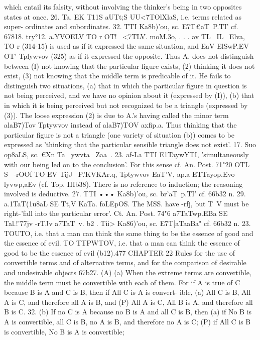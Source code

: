 {{{{{{which entail its falsity, without involving the thinker's being
in two opposites states at once.
26. Ta. EK T11S aUTt;S UU<7TOlXlaS, i.e. terms related as super-
ordinates and subordinates.
32. TTI Ka8b)'ou, sc. E7T£aT~P.TI' cf. 67818.
try°12. a.YVOELV TO r OT! ~<7TLV. {moM.{3o, . . . av TL~ IL~ Elva,
TO r (314-15) is used as if it expressed the same situation, and EaV
ElSwP.EV OT' Tplywvov (325) as if it expressed the opposite. Thus A.
does not distinguish between (I) not knowing that the particular
figure exists, (2) thinking it does not exist, (3) not knowing that
the middle term is predicable of it. He fails to distinguish two
situations, (a) that in which the particular figure in question is
not being perceived, and we have no opinion about it (expressed
by (I)), (b) that in which it is being perceived but not recognized
to be a triangle (expressed by (3)). The loose expression (2) is
due to A.'s having called the minor term alaB7)Tov Tptywvov
instead of alaB7)TOV axfip.a. Thus thinking that the particular
figure is not a triangle (one variety of situation (b)) comes to be
expressed as 'thinking that the particular sensible triangle does
not exist'.
17. Suo op8aLS, sc. €Xn Ta~ ywvta~ Zaa~.
23. af-La TTI E1TaywYTI, 'simultaneously with our being led on
to the conclusion'. For this sense cf. An. Post. 71"20 OTL S~ -rOOf
TO EV TijJ ~P.'KVKAr.q, Tptywvov EaT'V, ap.a ETTayop.Evo~ lyvwp,aEv (cf.
Top. IIIb38). There is no reference to induction; the reasoning
involved is deductive.
27. TTI ••• Ka8b)'ou, sc. br'aT~p.TI' cf. 66b32 n.
29. a.1TaT(1u8aL SE Tt,V KaTa. foLEpOS. The MSS. have -rfj, but
T~V must be right-'fall into the particular error'. Ct. An. Post.
74"6 a7TaTwp.EBa SE Tal.!'77jv -rTJv a7TaT~v.
b2 . Tii> Ka86)'ou, sc. E7T[aTaaBa" cf. 66b32 n.
23. TOUTO, i.e. that a man can think the same thing to be the
essence of good and the essence of evil. TO TTPWTOV, i.e. that a man
can think the essence of good to be the essence of evil (b12).477
CHAPTER 22
Rules for the use of convertible terms and of alternative terms, and for
the comparison of desirable and undesirable objects
67b27. (A) (a) When the extreme terms are convertible, the
middle term must be convertible with each of them. For if A is
true of C because B is A and C is B, then if All C is A is convert-
ible, (a) All C is B, All A is C, and therefore all A is B, and (P)
All A is C, All B is A, and therefore all B is C.
32. (b) If no C is A because no B is A and all C is B, then (a)
if No B is A is convertible, all C is B, no A is B, and therefore
no A is C; (P) if All C is B is convertible, No B is A is convertible;
}}}}}}}}
